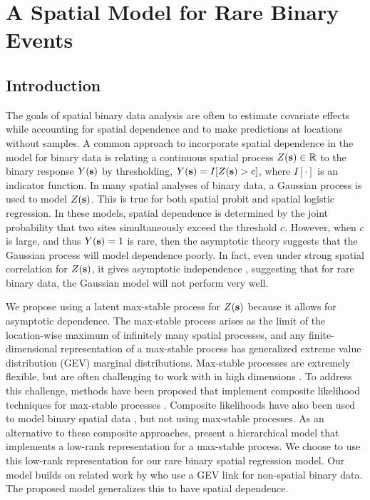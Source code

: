\chapter{A Spatial Model for Rare Binary Events}
\label{chap:three}

\section{Introduction}\label{rbs:intro}

The goals of spatial binary data analysis are often to estimate covariate effects while accounting for spatial dependence and to make predictions at locations without samples.
A common approach to incorporate spatial dependence in the model for binary data is relating a continuous spatial process $Z(\mathbf{s}) \in \mathbb{R}$ to the binary response $Y(\mathbf{s})$ by thresholding, $Y(\mathbf{s}) = I[Z(\mathbf{s}) > c]$, where $I[\cdot]$ is an indicator function.
In many spatial analyses of binary data, a Gaussian process is used to model $Z(\mathbf{s})$.
This is true for both spatial probit and spatial logistic regression.
In these models, spatial dependence is determined by the joint probability that two sites simultaneously exceed the threshold $c$.
However, when $c$ is large, and thus $Y(\mathbf{s}) = 1$ is rare, then the asymptotic theory suggests that the Gaussian process will model dependence poorly.
In fact, even under strong spatial correlation for $Z(\mathbf{s})$, it gives asymptotic independence \citep{Sibuya1960}, suggesting that for rare binary data, the Gaussian model will not perform very well.

We propose using a latent max-stable process \citep{deHaan1984} for $Z(\mathbf{s})$ because it allows for asymptotic dependence.
The max-stable process arises as the limit of the location-wise maximum of infinitely many spatial processes, and any finite-dimensional representation of a max-stable process has generalized extreme value distribution (GEV) marginal distributions.
Max-stable processes are extremely flexible, but are often challenging to work with in high dimensions \citep{Wadsworth2014,Thibaud2013a}.
To address this challenge, methods have been proposed that implement composite likelihood techniques for max-stable processes \citep{Padoan2010,Genton2011,Huser2014}.
Composite likelihoods have also been used to model binary spatial data \citep{Heagerty1998}, but not using max-stable processes.
As an alternative to these composite approaches, \citet{Reich2012} present a hierarchical model that implements a low-rank representation for a max-stable process.
We choose to use this low-rank representation for our rare binary spatial regression model.
Our model builds on related work by \citet{Wang2010} who use a GEV link for non-spatial binary data.
The proposed model generalizes this to have spatial dependence.

